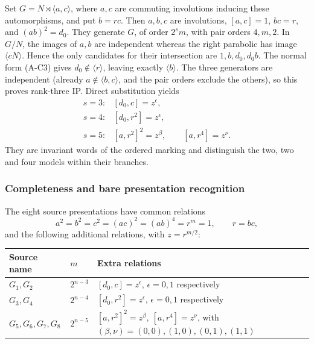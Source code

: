\documentclass[
  11pt,
  a4paper,
]{article}
\newcounter{none} %
\begin{document}
Set \(G=N\rtimes\langle a,c\rangle\), where \(a,c\) are commuting
involutions inducing these automorphisms, and put \(b=rc\). Then
\(a,b,c\) are involutions, \([a,c]=1\), \(bc=r\), and \((ab)^2=d_0\).
They generate \(G\), of order \(2^s m\), with pair orders \(4,m,2\). In
\(G/N\), the images of \(a,b\) are independent whereas the right
parabolic has image \(\langle cN\rangle\). Hence the only candidates for
their intersection are \(1,b,d_0,d_0b\). The normal form (A-C3) gives
\(d_0\notin\langle r\rangle\), leaving exactly \(\langle b\rangle\). The
three generators are independent (already \(a\notin\langle b,c\rangle\),
and the pair orders exclude the others), so this proves rank-three IP.
Direct substitution yields \[
 \begin{array}{ll}
 s=3:&[d_0,c]=z^\epsilon,\\
 s=4:&[d_0,r^2]=z^\epsilon,\\
 s=5:&[a,r^2]^2=z^\beta,\qquad[a,r^4]=z^\nu.
 \end{array}                                                   \tag{A-C4}
\] They are invariant words of the ordered marking and distinguish the
two, two and four models within their branches.

\subsubsection{Completeness and bare presentation
recognition}\label{completeness-and-bare-presentation-recognition}

The eight source presentations have common relations \[
 a^2=b^2=c^2=(ac)^2=(ab)^4=r^m=1,\qquad r=bc,
\] and the following additional relations, with \(z=r^{m/2}\):

{\def\LTcaptype{none} %
\begin{longtable}[]{@{}
  >{\raggedright\arraybackslash}p{}
  >{\raggedright\arraybackslash}p{}
  >{\raggedright\arraybackslash}p{}@{}}
\toprule\noalign{}
\begin{minipage}[b]{\linewidth}\raggedright
Source name
\end{minipage} & \begin{minipage}[b]{\linewidth}\raggedright
\(m\)
\end{minipage} & \begin{minipage}[b]{\linewidth}\raggedright
Extra relations
\end{minipage} \\
\midrule\noalign{}
\endhead
\bottomrule\noalign{}
\endlastfoot
\(G_1,G_2\) & \(2^{n-3}\) & \([d_0,c]=z^\epsilon\), \(\epsilon=0,1\)
respectively \\
\(G_3,G_4\) & \(2^{n-4}\) & \([d_0,r^2]=z^\epsilon\), \(\epsilon=0,1\)
respectively \\
\(G_5,G_6,G_7,G_8\) & \(2^{n-5}\) &
\([a,r^2]^2=z^\beta,\ [a,r^4]=z^\nu\), with
\((\beta,\nu)=(0,0),(1,0),(0,1),(1,1)\) \\
\end{longtable}
}
\end{document}
